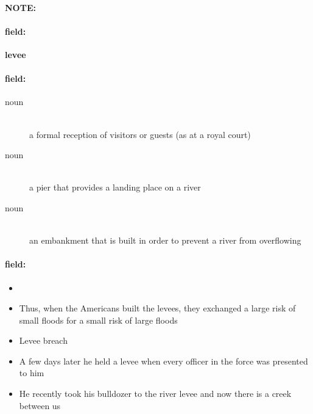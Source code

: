 \documentclass[12pt]{article}
\newenvironment{note}{\paragraph{NOTE:}}{}
\newenvironment{field}{\paragraph{field:}}{}
\begin{document}
\begin{note}
\begin{field}
\textbf{\large levee}
\end{field}


\begin{field}
\begin{description}
\item[noun] \hfill \\ 
a formal reception of visitors or guests (as at a royal court)

\item[noun] \hfill \\ 
a pier that provides a landing place on a river

\item[noun] \hfill \\ 
an embankment that is built in order to prevent a river from overflowing

\end{description}
\end{field}

\begin{field}
\begin{itemize}
\item 
\item Thus, when the Americans built the levees, they exchanged a large risk of small floods for a small risk of large floods
\item Levee breach
\item A few days later he held a levee when every officer in the force was presented to him
\item He recently took his bulldozer to the river levee and now there is a creek between us
\end{itemize}
\end{field}
\end{note}
\end{document}
